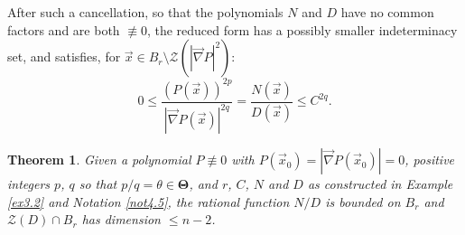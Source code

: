 \documentclass[12pt]{amsart}
\newtheorem{thm}{Theorem}[section]
\theoremstyle{definition}
\theoremstyle{remark}
\numberwithin{equation}{section}
\newcommand{\vv}{\mathcal{Z}}
\begin{document}
After such a cancellation, so that the polynomials $N$ and $D$ have no common factors and are both $\not\equiv0$, the reduced form has a possibly smaller indeterminacy set, and satisfies, for  $\vec x\in B_r\setminus\vv(|\vec\nabla P|^2)$:
$$0\le\frac{(P(\vec x))^{2p}}{\left|\vec\nabla P(\vec x)\right|^{2q}}=\frac{N(\vec x)}{D(\vec x)}\le C^{2q}.$$


\begin{thm}\label{thm3.2}
  Given a polynomial $P\not\equiv0$ with $P(\vec x_0)=|\vec\nabla P(\vec x_0)|=0$, positive integers $p$, $q$ so that  $p/q=\theta\in{\mathbf\Theta}$, and $r$, $C$, $N$ and $D$ as constructed in Example {\rm{\ref{ex3.2}}} and Notation {\rm{\ref{not4.5}}}, the rational function $N/D$ is bounded on $B_r$ and $\vv(D)\cap B_r$ has dimension $\le n-2$. 
\end{thm}
\end{document}
